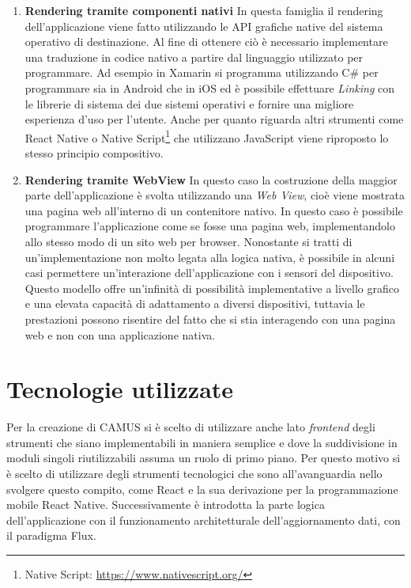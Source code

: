 \begin{enumerate}
	\item \textbf{Rendering tramite componenti nativi} In questa famiglia il rendering dell'applicazione viene fatto utilizzando le API grafiche native del sistema operativo di destinazione.
	Al fine di ottenere ciò è necessario implementare una traduzione in codice nativo a partire dal linguaggio utilizzato per programmare. Ad esempio in Xamarin si programma utilizzando C\# per programmare sia in Android che in iOS ed è possibile effettuare \emph{Linking} con le librerie di sistema dei due sistemi operativi e fornire una migliore esperienza d'uso per l'utente. Anche per quanto riguarda altri strumenti come React Native o Native Script\footnote{Native Script: \url{https://www.nativescript.org/}} che utilizzano JavaScript viene riproposto lo stesso principio compositivo.
	\item \textbf{Rendering tramite WebView} In questo caso la costruzione della maggior parte dell'applicazione è svolta utilizzando una \emph{Web View}, cioè viene mostrata una pagina web all'interno di un contenitore nativo.
	In questo caso è possibile programmare l'applicazione come se fosse una pagina web, implementandolo allo stesso modo di un sito web per browser. Nonostante si tratti di un'implementazione non molto legata alla logica nativa, è possibile in alcuni casi permettere un'interazione dell'applicazione con i sensori del dispositivo.
	Questo modello offre un'infinità di possibilità implementative a livello grafico e una elevata capacità di adattamento a diversi dispositivi, tuttavia le prestazioni possono risentire del fatto che si stia interagendo con una pagina web e non con una applicazione nativa.
\end{enumerate}

\section{Tecnologie utilizzate}\label{sec:tecnologie-app}
Per la creazione di CAMUS si è scelto di utilizzare anche lato \emph{frontend} degli strumenti che siano implementabili in maniera semplice e dove la suddivisione in moduli singoli riutilizzabili assuma un ruolo di primo piano. Per questo motivo si è scelto di utilizzare degli strumenti tecnologici che sono all'avanguardia nello svolgere questo compito, come React e la sua derivazione per la programmazione mobile React Native. Successivamente è introdotta la parte logica dell'applicazione con il funzionamento architetturale dell'aggiornamento dati, con il paradigma Flux.


